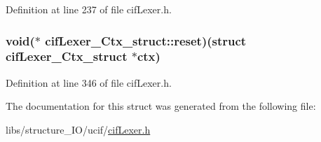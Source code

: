 Definition at line 237 of file cif\-Lexer.\-h.

\hypertarget{structcif_lexer___ctx__struct_a90320165e0a99885405cc155dc6bddac}{
\subsubsection[{reset}]{\setlength{\rightskip}{0pt plus 5cm}void($\ast$ cif\-Lexer\-\_\-\-Ctx\-\_\-struct\-::reset)(struct {\bf cif\-Lexer\-\_\-\-Ctx\-\_\-struct} $\ast$ctx)}}\label{structcif_lexer___ctx__struct_a90320165e0a99885405cc155dc6bddac}


Definition at line 346 of file cif\-Lexer.\-h.



The documentation for this struct was generated from the following file\-:\begin{DoxyCompactItemize}
\item 
libs/structure\-\_\-\-I\-O/ucif/\hyperlink{cif_lexer_8h}{cif\-Lexer.\-h}\end{DoxyCompactItemize}
